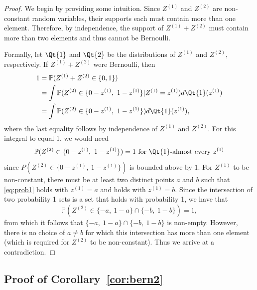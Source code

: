 \documentclass[12pt]{article}
\begin{document}
\begin{proof}
We begin by providing some intuition. Since $Z^{(1)}$ and $Z^{(2)}$ are non-constant random variables, their supports each must contain more than one element. Therefore, by independence, the support of $Z^{(1)} + Z^{(2)}$ must contain more than two elements and thus cannot be Bernoulli.

Formally, let $\Qt{1}$ and $\Qt{2}$ be the distributions of $Z^{(1)}$ and $Z^{(2)}$, respectively.
If $Z^{(1)}+Z^{(2)}$ were Bernoulli, then
\begin{align*}
    1&=\mathbb P(Z^{(1)}+Z^{(2)}\in\{0,1\})\\
    &=\int\mathbb P(Z^{(2)}\in\{0-z^{(1)},~1-z^{(1)}\}|Z^{(1)}=z^{(1)})d\Qt{1}(z^{(1)})\\
    &=\int\mathbb P(Z^{(2)}\in\{0-z^{(1)},~1-z^{(1)}\})d\Qt{1}(z^{(1)}),
\end{align*}
where the last equality follows by independence of $Z^{(1)}$ and $Z^{(2)}$.  
For this integral to equal 1, we would need
\begin{equation}\label{eq:prob1}
    \mathbb P(Z^{(2)}\in\{0-z^{(1)},~1-z^{(1)}\})=1 \text{ for $\Qt{1}$-almost every $z^{(1)}$}
\end{equation}
since $P(Z^{(2)}\in\{0-z^{(1)},~1-z^{(1)}\})$ is bounded above by $1$. For $Z^{(1)}$ to be non-constant, there must be at least two distinct points $a$ and $b$ such that \eqref{eq:prob1} holds with $z^{(1)}=a$ and holds with $z^{(1)}=b$.  Since the intersection of two probability 1 sets is a set that holds with probability 1, we have that 
$$
\mathbb P(Z^{(2)}\in\{-a,~1-a\}\cap\{-b,~1-b\})=1,
$$
from which it follows that $\{-a,~1-a\}\cap\{-b,~1-b\}$ is non-empty.  However, there is no choice of $a\neq b$ for which this intersection has more than one element (which is required for $Z^{(2)}$ to be non-constant).  Thus we arrive at a contradiction.

\end{proof}

\subsection{Proof of Corollary~\ref{cor:bern2}} \label{app:bern2}
\end{document}
